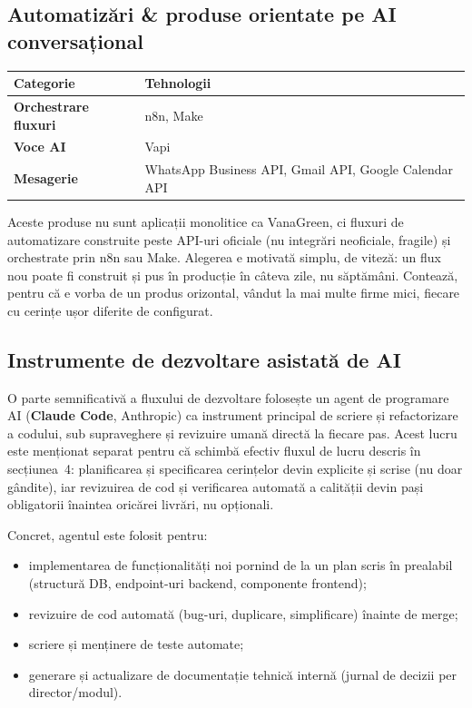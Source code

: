 \documentclass[11pt, a4paper]{article}
\begin{document}
\vspace{0.5em}
\subsection{Automatizări \& produse orientate pe AI conversațional}

\begin{tabularx}{\textwidth}{>{\bfseries}l X}
\toprule
Categorie & Tehnologii \\
\midrule
Orchestrare fluxuri & n8n, Make \\
Voce AI & Vapi \\
Mesagerie & WhatsApp Business API, Gmail API, Google Calendar API \\
\bottomrule
\end{tabularx}

\vspace{0.5em}
\noindent Aceste produse nu sunt aplicații monolitice ca VanaGreen, ci fluxuri de automatizare
construite peste API-uri oficiale (nu integrări neoficiale, fragile) și orchestrate prin n8n sau
Make. Alegerea e motivată simplu, de viteză: un flux nou poate fi construit și pus în producție
în câteva zile, nu săptămâni. Contează, pentru că e vorba de un produs orizontal, vândut la mai
multe firme mici, fiecare cu cerințe ușor diferite de configurat.

\subsection{Instrumente de dezvoltare asistată de AI}

O parte semnificativă a fluxului de dezvoltare folosește un agent de programare AI
(\textbf{Claude Code}, Anthropic) ca instrument principal de scriere și refactorizare a codului,
sub supraveghere și revizuire umană directă la fiecare pas. Acest lucru este menționat separat
pentru că schimbă efectiv fluxul de lucru descris în secțiunea~4: planificarea și specificarea
cerințelor devin explicite și scrise (nu doar gândite), iar revizuirea de cod și verificarea
automată a calității devin pași obligatorii înaintea oricărei livrări, nu opționali.

Concret, agentul este folosit pentru:
\begin{itemize}[leftmargin=1.5em, itemsep=0.2em]
  \item implementarea de funcționalități noi pornind de la un plan scris în prealabil (structură DB, endpoint-uri backend, componente frontend);
  \item revizuire de cod automată (bug-uri, duplicare, simplificare) înainte de merge;
  \item scriere și menținere de teste automate;
  \item generare și actualizare de documentație tehnică internă (jurnal de decizii per director/modul).
\end{itemize}
\end{document}
